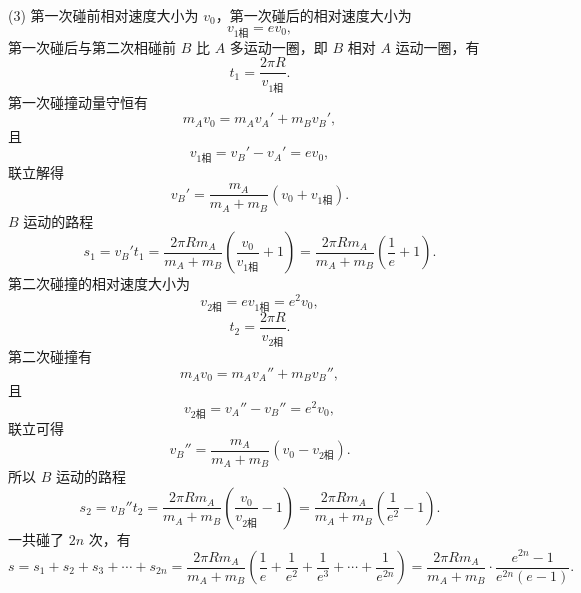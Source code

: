 \begin{answer}
(3) 第一次碰前相对速度大小为 $v_{0}$，第一次碰后的相对速度大小为
\[
  v_{1\text{相}}=ev_{0},
\]
第一次碰后与第二次相碰前 $B$ 比 $A$ 多运动一圈，即 $B$ 相对 $A$ 运动一圈，有
\[
  t_{1}=\frac{2\pi R}{v_{1\text{相}}}.
\]
第一次碰撞动量守恒有
\[
  m_{A}v_{0}=m_{A}v_{A}'+m_{B}v_{B}',
\]
且
\[
  v_{1\text{相}}=v_{B}'-v_{A}'=ev_{0},
\]
联立解得
\[
  v_{B}'=\frac{m_{A}}{m_{A}+m_{B}}(v_{0}+v_{1\text{相}}).
\]
$B$ 运动的路程
\[
  s_{1}=v_{B}'t_{1}
     =\frac{2\pi Rm_{A}}{m_{A}+m_{B}}\left(\frac{v_{0}}{v_{1\text{相}}}+1\right)
     =\frac{2\pi Rm_{A}}{m_{A}+m_{B}}\left(\frac{1}{e}+1\right).
\]
第二次碰撞的相对速度大小为
\[
  v_{2\text{相}}=ev_{1\text{相}}=e^{2}v_{0},
\]
\[
  t_{2}=\frac{2\pi R}{v_{2\text{相}}}.
\]
第二次碰撞有
\[
  m_{A}v_{0}=m_{A}v_{A}''+m_{B}v_{B}'',
\]
且
\[
  v_{2\text{相}}=v_{A}''-v_{B}''=e^{2}v_{0},
\]
联立可得
\[
  v_{B}''=\frac{m_{A}}{m_{A}+m_{B}}(v_{0}-v_{2\text{相}}).
\]
所以 $B$ 运动的路程
\[
  s_{2}=v_{B}''t_{2}
     =\frac{2\pi Rm_{A}}{m_{A}+m_{B}}\left(\frac{v_{0}}{v_{2\text{相}}}-1\right)
     =\frac{2\pi Rm_{A}}{m_{A}+m_{B}}\left(\frac{1}{e^{2}}-1\right).
\]
一共碰了 $2n$ 次，有
\[
  s=s_{1}+s_{2}+s_{3}+\cdots+s_{2n}
   =\frac{2\pi Rm_{A}}{m_{A}+m_{B}}\left(\frac{1}{e}+\frac{1}{e^{2}}+\frac{1}{e^{3}}+\cdots+\frac{1}{e^{2n}}\right)
   =\frac{2\pi Rm_{A}}{m_{A}+m_{B}}\cdot\frac{e^{2n}-1}{e^{2n}(e-1)}.
\]
\end{answer}
